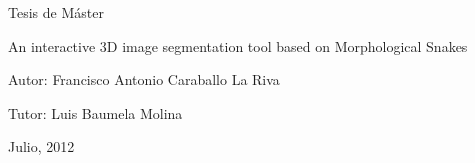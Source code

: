 \begin{titlepage}
{\Large \bigskip{}
}{\Large \par}

\begin{center}
{\Large Tesis de Máster}
\par\end{center}{\Large \par}


\medskip{}



\begin{center}
{\LARGE An interactive 3D image segmentation tool based on Morphological
Snakes}
\par\end{center}{\LARGE \par}


\vfill{}


Autor: Francisco Antonio Caraballo La Riva

Tutor: Luis Baumela Molina

\begin{center}
Julio, 2012
\par\end{center}

\end{titlepage}

